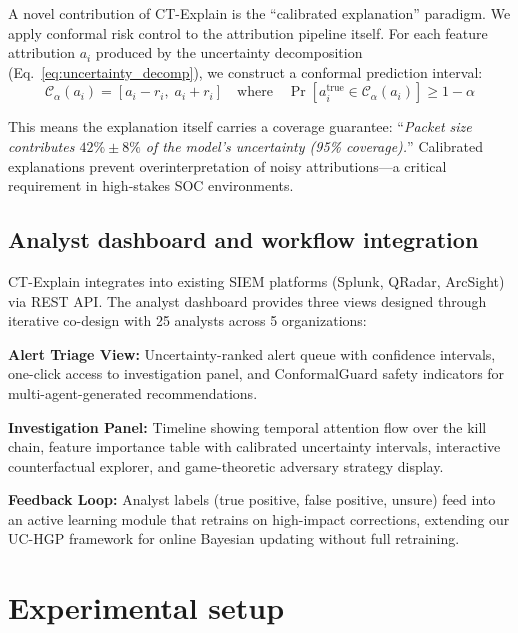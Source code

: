\documentclass[preprint,review,12pt]{elsarticle}
\newcommand{\calC}{\mathcal{C}}
\begin{document}
A novel contribution of CT-Explain is the ``calibrated explanation'' paradigm. We apply conformal risk control \cite{angelopoulos_crc_2024} to the attribution pipeline itself. For each feature attribution $a_i$ produced by the uncertainty decomposition (Eq.~\ref{eq:uncertainty_decomp}), we construct a conformal prediction interval:
\begin{equation}
    \calC_\alpha(a_i) = [a_i - r_i, \; a_i + r_i] \quad \text{where} \quad \Pr[a_i^{\text{true}} \in \calC_\alpha(a_i)] \geq 1 - \alpha
\end{equation}

This means the explanation itself carries a coverage guarantee: ``\textit{Packet size contributes $42\% \pm 8\%$ of the model's uncertainty (95\% coverage).}'' Calibrated explanations prevent overinterpretation of noisy attributions---a critical requirement in high-stakes SOC environments.

\subsection{Analyst dashboard and workflow integration}

CT-Explain integrates into existing SIEM platforms (Splunk, QRadar, ArcSight) via REST API. The analyst dashboard provides three views designed through iterative co-design with 25 analysts across 5 organizations:

\textbf{Alert Triage View:} Uncertainty-ranked alert queue with confidence intervals, one-click access to investigation panel, and ConformalGuard safety indicators for multi-agent-generated recommendations.

\textbf{Investigation Panel:} Timeline showing temporal attention flow over the kill chain, feature importance table with calibrated uncertainty intervals, interactive counterfactual explorer, and game-theoretic adversary strategy display.

\textbf{Feedback Loop:} Analyst labels (true positive, false positive, unsure) feed into an active learning module that retrains on high-impact corrections, extending our UC-HGP framework \cite{anaedevha_uc_hgp} for online Bayesian updating without full retraining.


\section{Experimental setup}
\label{sec:experimental_setup}
\end{document}
